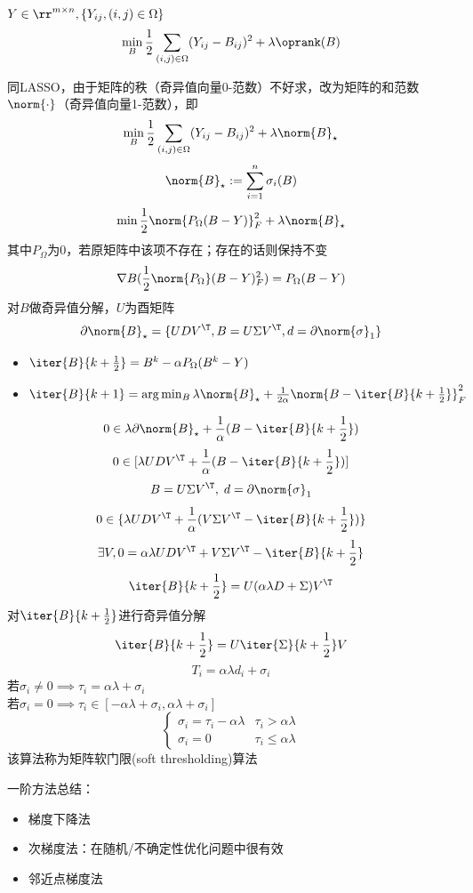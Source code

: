 \begin{example}[矩阵补全]
    $Y\in\rr^{m\times n},\{Y_{ij},(i,j)\in\Omega\}$
    \[\min_B\frac{1}{2}\sum_{(i,j)\in\Omega}(Y_{ij}-B_{ij})^2+\lambda\oprank(B)\]
\end{example}
\begin{analysis}
    同LASSO，由于矩阵的秩（奇异值向量0-范数）不好求，改为矩阵的和范数$\norm{\cdot}$（奇异值向量1-范数），即
    \[\min_B\frac{1}{2}\sum_{(i,j)\in\Omega}(Y_{ij}-B_{ij})^2+\lambda\norm{B}_\star\]
    \[\norm{B}_\star:=\sum_{i=1}^n\sigma_i(B)\]
    \[\min\frac{1}{2}\norm{P_\Omega(B-Y)}_F^2+\lambda\norm{B}_\star\]
    其中$P_\Omega$为$0$，若原矩阵中该项不存在；存在的话则保持不变
    \[\nabla B(\frac{1}{2}\norm{P_\Omega}(B-Y)_F^2)=P_\Omega(B-Y)\]
    对$B$做奇异值分解，$U$为酉矩阵
    \[\partial\norm{B}_\star=\{UDV^\T, B=U\Sigma V^\T, d=\partial\norm{\sigma}_1\}\]
    \begin{itemize}
        \item $\iter{B}{k+\frac{1}{2}}=B^k-\alpha P_\Omega(B^k-Y)$
        \item $\iter{B}{k+1}=\arg\min_B\lambda\norm{B}_\star+\frac{1}{2\alpha}\norm{B-\iter{B}{k+\frac{1}{2}}}_F^2$
    \end{itemize}
    \[0\in\lambda\partial\norm{B}_\star+\frac{1}{\alpha}(B-\iter{B}{k+\frac{1}{2}})\]
    \[0\in[\lambda UDV^\T+\frac{1}{\alpha}(B-\iter{B}{k+\frac{1}{2}})]\]
    \[B=U\Sigma V^\T,\;d=\partial\norm{\sigma}_1\]
    \[0\in\{\lambda UDV^\T +\frac{1}{\alpha}(V\Sigma V^\T-\iter{B}{k+\frac{1}{2}})\}\]
    \[\exists V,0=\alpha\lambda UDV^\T+V\Sigma V^\T-\iter{B}{k+\frac{1}{2}}\]
    \[\iter{B}{k+\frac{1}{2}}=U(\alpha\lambda D+\Sigma)V^\T\]
    对$\iter{B}{k+\frac{1}{2}}$进行奇异值分解
    \[\iter{B}{k+\frac{1}{2}}=U\iter{\Sigma}{k+\frac{1}{2}}V\]
    \[T_i=\alpha\lambda d_i+\sigma_i\]
    若$\sigma_i\ne 0\implies \tau_i=\alpha\lambda+\sigma_i$\\
    若$\sigma_i=0\implies \tau_i\in[-\alpha\lambda+\sigma_i,\alpha\lambda+\sigma_i]$\\
    \[\begin{cases}
        \sigma_i=\tau_i-\alpha\lambda & \tau_i>\alpha\lambda\\
        \sigma_i=0 & \tau_i\leq\alpha\lambda
    \end{cases}\]
    该算法称为矩阵软门限(soft thresholding)算法
\end{analysis}

一阶方法总结：
\begin{itemize}
    \item 梯度下降法
    \item 次梯度法：在随机/不确定性优化问题中很有效
    \item 邻近点梯度法
\end{itemize}
